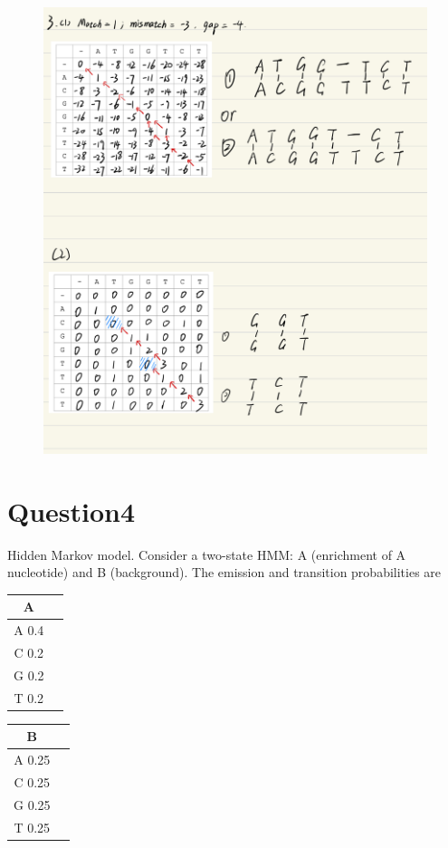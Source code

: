 \documentclass{article}
\begin{document}
\begin{figure}[H] %
    \centering
    \includegraphics[width=1\textwidth]{q3answer.jpeg}  %

\end{figure}


\section{Question4}
Hidden Markov model. Consider a two-state HMM: A (enrichment of A nucleotide) and B (background). 
The emission and transition probabilities are


\centering %
\begin{tabular}{|c|c|}
    \hline
    A\\
    \hline
    A  0.4 \\
    C  0.2  \\
    G  0.2\\
    T  0.2\\
    \hline
\end{tabular}
\begin{tabular}{|c|c|}
    \hline
    B\\
    \hline
    A  0.25 \\
    C  0.25  \\
    G  0.25\\
    T  0.25\\
    \hline
\end{tabular}
\end{document}
